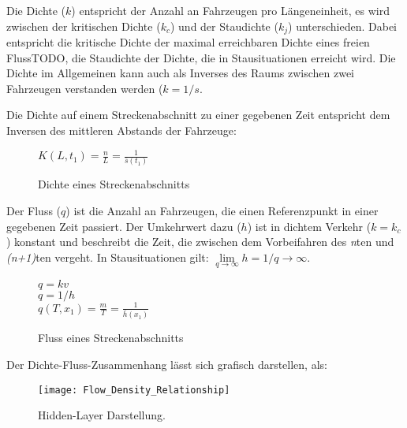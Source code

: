 Die Dichte (\(k\)) entspricht der Anzahl an Fahrzeugen pro Längeneinheit, es wird zwischen der kritischen Dichte (\(k_c\)) und der Staudichte (\(k_j\)) unterschieden. Dabei entspricht die kritische Dichte der maximal erreichbaren Dichte eines freien FlussTODO, die Staudichte der Dichte, die in Stausituationen erreicht wird. Die Dichte im Allgemeinen kann auch als Inverses des Raums zwischen zwei Fahrzeugen verstanden werden (\(k = 1 / s\).

Die Dichte auf einem Streckenabschnitt zu einer gegebenen Zeit entspricht dem Inversen des mittleren Abstands der Fahrzeuge:

\begin{figure}[H]
\( K(L, t_1) = \frac{n}{L} = \frac{1}{\bar{s}(t_1)} \)
    \caption{Dichte eines Streckenabschnitts}
    \label{func:makro_density}
\end{figure}

Der Fluss (\(q\)) ist die Anzahl an Fahrzeugen, die einen Referenzpunkt in einer gegebenen Zeit passiert. Der Umkehrwert dazu (\(h\)) ist in dichtem Verkehr (\(k = k_c\)) konstant und beschreibt die Zeit, die zwischen dem Vorbeifahren des \textit{n}ten und \textit{(n+1)}ten vergeht. In Stausituationen gilt: \(\lim\limits_{q \to \infty}{h = 1/q}\rightarrow\infty\).

\begin{figure}[H]
    \( q=kv \)\\
    \( q=1/h \)\\
    \( q(T, x_1) = \frac{m}{T} = \frac{1}{\bar{h}(x_1)} \)\\
    \caption{Fluss eines Streckenabschnitts}
    \label{func:makro_density}
\end{figure}

Der Dichte-Fluss-Zusammenhang lässt sich grafisch darstellen, als:

\begin{figure}[H]
    \centering
    \texttt{[image: Flow\_Density\_Relationship]}
    \caption{Hidden-Layer Darstellung.}
    \label{fig:hidden-layers}
\end{figure}
